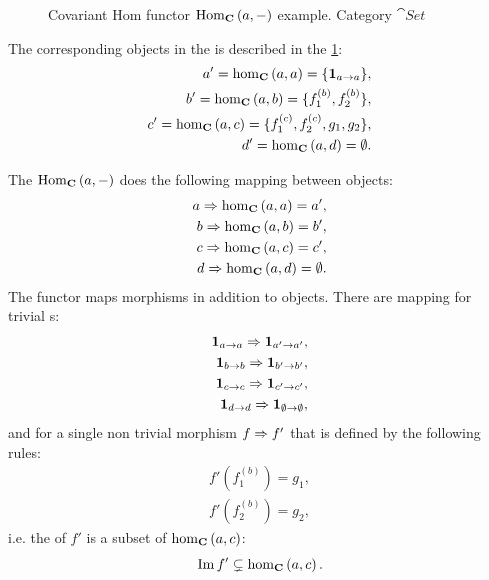 \begin{example}
\begin{figure}
\begin{tikzpicture}[ele/.style={fill=black,circle,minimum
          width=.8pt,inner sep=1pt},every fit/.style={ellipse,draw,inner
          sep=-2pt}]
    \end{tikzpicture}
    \caption{Covariant Hom functor $\mathrm{Hom}_{\mathbf{C}}\left(a, -\right)$ example. Category $\cat{Set}$}
    \label{fig:cov_hom_functor_set}
  \end{figure}

The corresponding
objects in the  is described in the
\cref{fig:cov_hom_functor_set}: 
\begin{eqnarray}
a' = \catmset[C]{a}{a} = \{\idm{a}\},
\nonumber \\
b' = \catmset[C]{a}{b} = \{f_1^{(b)}, f_2^{(b)}\}, 
\nonumber \\
c' = \catmset[C]{a}{c} = \{f_1^{(c)}, f_2^{(c)}, g_1, g_2\}, 
\nonumber \\
d' = \catmset[C]{a}{d} = \emptyset.
\nonumber
\end{eqnarray}

The $\mathrm{Hom}_{\mathbf{C}}\left(a, -\right)$ does the following mapping between objects:
\begin{eqnarray}
a \tof \catmset[C]{a}{a} = a',
\nonumber \\
b \tof \catmset[C]{a}{b} = b', 
\nonumber \\
c \tof \catmset[C]{a}{c} = c', 
\nonumber \\
d \tof \catmset[C]{a}{d} = \emptyset.
\nonumber
\end{eqnarray}
The functor maps morphisms in addition to objects. There are mapping
for trivial s: 
\begin{eqnarray}
\mathbf{1}_{ a \to a } \Rightarrow \mathbf{1}_{ a' \to a' },
\nonumber \\
\mathbf{1}_{ b \to b } \Rightarrow \mathbf{1}_{ b' \to b' },
\nonumber \\
\mathbf{1}_{ c \to c } \Rightarrow \mathbf{1}_{ c' \to c' },
\nonumber \\
\mathbf{1}_{ d \to d } \Rightarrow \mathbf{1}_{ \emptyset \to \emptyset },
\nonumber
\end{eqnarray}
and for a single non trivial morphism $f \Rightarrow f'$ that is defined by
the following rules:
\begin{eqnarray}
f'(f_1^{(b)}) = g_1,
\nonumber \\
f'(f_2^{(b)}) = g_2,
\nonumber
\end{eqnarray}
i.e. the  of $f'$ is a subset of
$\catmset[C]{a}{c}$:
\[
\Ima{f'} \subsetneq \catmset[C]{a}{c}.
\]
\end{example}

